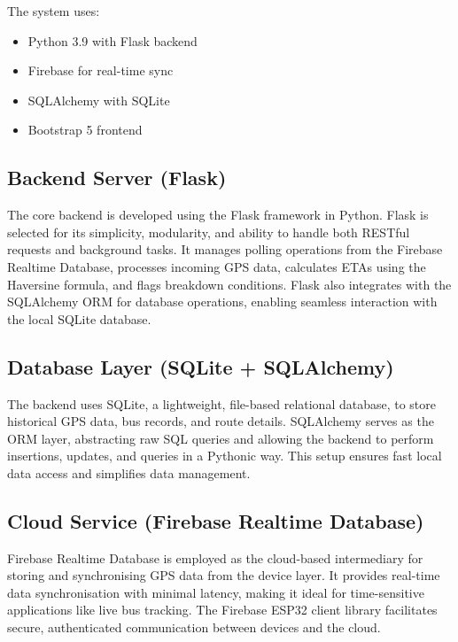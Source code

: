 \documentclass{article}
\begin{document}
\begin{multicols}{2}
The system uses:

\vspace{0.8em}
\begin{itemize}
\item Python 3.9 with Flask backend
\vspace{0.5em}
\item Firebase for real-time sync
\vspace{0.5em}
\item SQLAlchemy with SQLite
\vspace{0.5em}
\item Bootstrap 5 frontend
\end{itemize}

\subsection{Backend Server (Flask)}
The core backend is developed using the Flask framework in Python. Flask is selected for its simplicity, modularity, and ability to handle both RESTful requests and background tasks. It manages polling operations from the Firebase Realtime Database, processes incoming GPS data, calculates ETAs using the Haversine formula, and flags breakdown conditions. Flask also integrates with the SQLAlchemy ORM for database operations, enabling seamless interaction with the local SQLite database.

\subsection{Database Layer (SQLite + SQLAlchemy)}
The backend uses SQLite, a lightweight, file-based relational database, to store historical GPS data, bus records, and route details. SQLAlchemy serves as the ORM layer, abstracting raw SQL queries and allowing the backend to perform insertions, updates, and queries in a Pythonic way. This setup ensures fast local data access and simplifies data management.

\subsection{Cloud Service (Firebase Realtime Database)}
Firebase Realtime Database is employed as the cloud-based intermediary for storing and synchronising GPS data from the device layer. It provides real-time data synchronisation with minimal latency, making it ideal for time-sensitive applications like live bus tracking. The Firebase ESP32 client library facilitates secure, authenticated communication between devices and the cloud.


\end{multicols}
\end{document}

